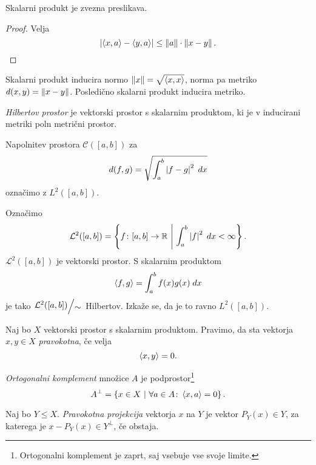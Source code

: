 \begin{posledica}
Skalarni produkt je zvezna preslikava.
\end{posledica}

\begin{proof}
Velja
\[
\left\lvert \left\langle x,a\right\rangle - \left\langle y,a\right\rangle\right\rvert \leq \left\lVert a\right\rVert \cdot \left\lVert x - y\right\rVert.
\qedhere
\]
\end{proof}

\begin{opomba}
Skalarni produkt inducira normo $\left\lVert x\right\rVert = \sqrt{\left\langle x,x\right\rangle}$,
norma pa metriko $d(x,y) = \left\lVert x - y\right\rVert$. Posledično skalarni
produkt inducira metriko.
\end{opomba}

\begin{definicija}
\emph{Hilbertov prostor} je vektorski
prostor s skalarnim produktom, ki je v inducirani metriki poln
metrični prostor.
\end{definicija}

\begin{definicija}
Napolnitev prostora $\mathcal{C}([a,b])$ za
\[
d(f,g) = \sqrt{\int_a^b \left\lvert f-g\right\rvert^2\;dx}
\]
označimo z $L^2([a,b])$.
\end{definicija}

\begin{opomba}
Označimo
\[
\mathcal{L}^2([a,b]) =
\left\{f \colon [a,b] \to \mathbb{R}~\middle\vert~\int_a^b \left\lvert f\right\rvert^2\;dx < \infty\right\}.
\]
$\mathcal{L}^2([a,b])$ je vektorski prostor. S skalarnim produktom
\[
\left\langle f,g\right\rangle = \int_a^b f(x)g(x)\;dx
\]
je tako $\kvoc{\mathcal{L}^2([a,b])}{\sim}$ Hilbertov. Izkaže se,
da je to ravno $L^2([a,b])$.
\end{opomba}

\begin{definicija}
Naj bo $X$ vektorski prostor s skalarnim produktom. Pravimo, da sta
vektorja $x, y \in X$ \emph{pravokotna}, če
velja
\[
\left\langle x,y\right\rangle = 0.
\]
\end{definicija}


\begin{definicija}
\emph{Ortogonalni komplement}
množice $A$ je podprostor\footnote{Ortogonalni komplement je zaprt,
saj vsebuje vse svoje limite.}
\[
A^\bot = \left\{x \in X~\middle\vert~\forall a \in A \colon \left\langle x,a\right\rangle = 0\right\}.
\]
\end{definicija}

\begin{definicija}
Naj bo $Y \leq X$. \emph{Pravokotna projekcija} vektorja $x$ na $Y$
je vektor $P_Y(x) \in Y$, za katerega je $x-P_Y(x) \in Y^\bot$, če
obstaja.
\end{definicija}

